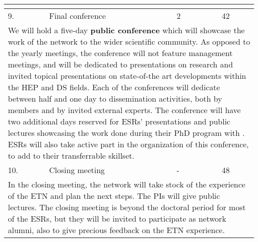 \begin{center}
{\begin{tabular}{@{}lp{56mm}p{7mm}p{40mm}p{20mm}@{}}
{%
				} \tabularnewline \hline\midrule				
				
				
				\cellcolor{cyan} 9. & Final conference & 2 & \cnrsentity & 42  \tabularnewline \hline
				
				\multicolumn{5}{p{\textwidth}}{					
				
				We will hold a five-day \textbf{public conference}
				which will showcase the work of the network to the wider scientific community. 
				As opposed to the yearly meetings, the conference will not feature management meetings,
				and will be dedicated to presentations on \acronym research
				and invited topical presentations on state-of-the art developments within the HEP and DS fields. 
				Each of the conferences will dedicate between
				half and one day to dissemination activities, both by \acronym members and by invited external experts. 
				The conference will have two additional days reserved for ESRs' presentations and 
				public lectures showcasing the work done during their PhD program with \acronym. ESRs will also
				take active part in the organization of this conference, to add to their transferrable skillset. 
				} \tabularnewline \hline\midrule
						
				\cellcolor{red!70!black} 10. & Closing meeting & - & \lundentity & 48  \tabularnewline\midrule
				
				\multicolumn{5}{p{\textwidth}}{					
				
				In the closing meeting, the network will take stock of the experience of the ETN and plan the next steps. The PIs will give 
				public lectures. The closing meeting is beyond the doctoral period for most of the ESRs,
				but they will be invited to participate as network alumni, also to give precious feedback on the ETN experience. 

				} \tabularnewline \hline\midrule

				\bottomrule
			\end{tabular}

}%
\end{center}

